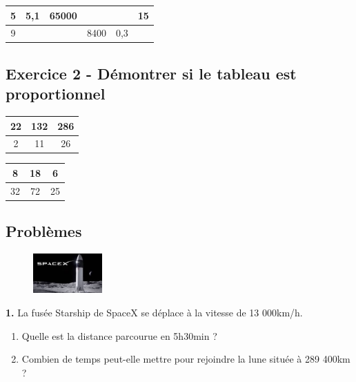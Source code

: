 \begin{center}
  \begin{tabular}{|c|c|c|c|c|c|}
    \hline
   5 &  5,1                   &                  65000 &  \phantom{100 000 000} &  \phantom{100 000 000} &                     15\\ \hline
   9 &  \phantom{100 000 000} &  \phantom{100 000 000} &                   8400 &                    0,3 &  \phantom{100 000 000}\\ \hline     
  \end{tabular}
\end{center}
\Pointilles[4]


\subsection*{Exercice 2 - Démontrer si le tableau est proportionnel}

\begin{multicols}{2}
  \begin{center}
    \begin{tabular}{|c|c|c|}
      \hline
      22 & 132 & 286 \\  \hline
      2 & 11 & 26\\  \hline
    \end{tabular}
  \end{center}
  \begin{center}
    \begin{tabular}{|c|c|c|}
      \hline
      8 & 18 & 6 \\  \hline
      32 & 72 & 25\\  \hline
    \end{tabular}
  \end{center}
\end{multicols}

\Pointilles[6]


\subsection*{Problèmes}

\begin{minipage}[t]{0.25\textwidth}
  \begin{figure}[H]
    \centering
    \includegraphics[width=100px]{4x3-proportionnalite/ex1.jpg}
  \end{figure}
\end{minipage}
\begin{minipage}[t]{0.75\textwidth}
\textbf{1.} La fusée Starship de SpaceX se déplace à la vitesse de 13 000km/h. 

\begin{enumerate}
  \item[1.] Quelle est la distance parcourue en 5h30min ? 
  \item[2.] Combien de temps peut-elle mettre pour rejoindre la lune située à 289 400km ? 
\end{enumerate}

\Pointilles[2]
\end{minipage}

